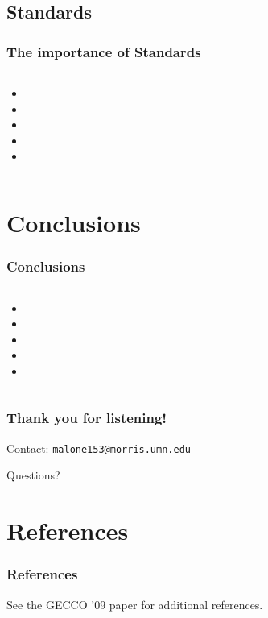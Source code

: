 \documentclass{beamer}
\newcommand{\linespace}{\vskip 0.25cm}
\begin{document}
\subsection{Standards}

\begin{frame}
  \frametitle{The importance of Standards}
  
  \begin{columns}
  \begin{column}{0.6\textwidth}
  \begin{itemize}
  	\item 
	\item 
	\item 
	\item 
	\item 
  \end{itemize}
  \end{column}
  \end{columns}
\end{frame}

\section[Conclusions]{Conclusions}

\begin{frame}
  \frametitle{Conclusions}
  
  \begin{columns}
  \begin{column}{0.6\textwidth}
  \begin{itemize}
  	\item 
	\item 
	\item 
	\item 
	\item 
  \end{itemize}
  \end{column}
  \end{columns}
\end{frame}




\begin{frame}
	\frametitle{Thank you for listening!}
	
	
		
	\linespace
	\linespace
	
	Contact:  
		\texttt{malone153@morris.umn.edu}
	
	\linespace
	\linespace
	
	\begin{center}
	{\huge Questions?}
	\end{center}
\end{frame}

\section*{References}

\begin{frame} 
	\frametitle{References} 
	
	
	
	\linespace
	\begin{center}
	See the GECCO '09 paper for additional references.
	\end{center}
\end{frame} 
\end{document}
